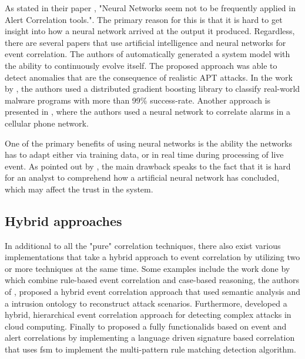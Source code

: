 As \textcite{pouget2003alert} stated in their paper , "Neural Networks seem not to be frequently applied in Alert Correlation tools.". The primary reason for this is that it is hard to get insight into how a neural network arrived at the output it produced. Regardless, there are several papers that use artificial intelligence and neural networks for event correlation. The authors of  \textcite{friedberg2015combating} automatically generated a system model with the ability to continuously evolve itself. The proposed approach was able to detect anomalies that are the consequence of realistic APT attacks. In the work by \textcite{lin2019detecting}, the authors used a distributed gradient boosting library to classify real-world malware programs with more than 99\% success-rate. Another approach is presented in , where the authors \textcite{wietgrefe1997using} used a neural network to correlate alarms in a cellular phone network.

One of the primary benefits of using neural networks is the ability the networks has to adapt either via training data, or in real time during processing of live event. As pointed out by \textcite{pouget2003alert}, the main drawback speaks to the fact that it is hard for an analyst to comprehend how a artificial neural network has concluded, which may affect the trust in the system.

\subsection{Hybrid approaches}
In additional to all the "pure" correlation techniques, there also exist various implementations that take a hybrid approach to event correlation by utilizing two or more techniques at the same time.
Some examples include the work done by \textcite{hanemann_2008} which combine rule-based event correlation and case-based reasoning, the authors of , \textcite{saad2012extracting} proposed a hybrid event correlation approach that used semantic analysis and a intrusion ontology to reconstruct attack scenarios. Furthermore, \textcite{ficco2013security} developed a hybrid, hierarchical event correlation approach for detecting complex attacks in cloud computing. Finally \textcite{Ludovic_2004} to proposed a fully functional\acrshort{ids} based on event and alert correlations by implementing a language driven signature based correlation that uses \acrshort{fsm} to implement the multi-pattern rule matching detection algorithm.

